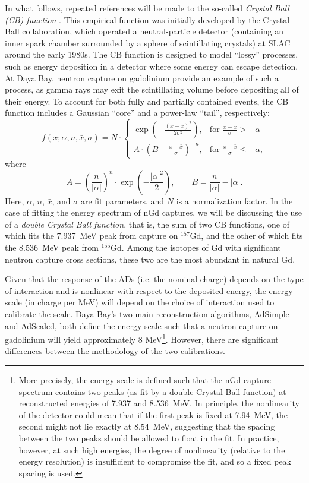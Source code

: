 \documentclass[../thesis.tex]{subfiles}
\begin{document}
In what follows, repeated references will be made to the so-called \emph{Crystal Ball (CB) function} \cite{cbfunction}. This empirical function was initially developed by the Crystal Ball collaboration, which operated a neutral-particle detector (containing an inner spark chamber surrounded by a sphere of scintillating crystals) at SLAC around the early 1980s. The CB function is designed to model ``lossy'' processes, such as energy deposition in a detector where some energy can escape detection. At Daya Bay, neutron capture on gadolinium provide an example of such a process, as gamma rays may exit the scintillating volume before depositing all of their energy. To account for both fully and partially contained events, the CB function includes a Gaussian ``core'' and a power-law ``tail'', respectively:
\begin{equation}
  \label{eq:cbfunction}
  f(x;\alpha,n,\bar x,\sigma) = N \cdot \begin{cases} \exp(- \frac{(x - \bar x)^2}{2 \sigma^2}), & \mbox{for }\frac{x - \bar x}{\sigma} > -\alpha \\
    A \cdot (B - \frac{x - \bar x}{\sigma})^{-n}, & \mbox{for }\frac{x - \bar x}{\sigma} \leqslant -\alpha,\end{cases}
\end{equation}
where
\[
  A = \left(\frac{n}{\left| \alpha \right|}\right)^n \cdot \exp\left(- \frac {\left| \alpha \right|^2}{2}\right),%
  \qquad%
  B = \frac{n}{\left| \alpha \right|}  - \left| \alpha \right|.
\]
Here, $\alpha$, $n$, $\bar x$, and $\sigma$ are fit parameters, and $N$ is a normalization factor. In the case of fitting the energy spectrum of nGd captures, we will be discussing the use of a \emph{double Crystal Ball function}, that is, the sum of two CB functions, one of which fits the 7.937~MeV peak from capture on $^{157}$Gd, and the other of which fits the 8.536~MeV peak from $^{155}$Gd. Among the isotopes of Gd with significant neutron capture cross sections, these two are the most abundant in natural Gd.

Given that the response of the ADs (i.e. the nominal charge) depends on the type of interaction and is nonlinear with respect to the deposited energy, the energy scale (in charge per MeV) will depend on the choice of interaction used to calibrate the scale. Daya Bay's two main reconstruction algorithms, AdSimple and AdScaled, both define the energy scale such that a neutron capture on gadolinium will yield approximately 8 MeV\footnote{More precisely, the energy scale is defined such that the nGd capture spectrum contains two peaks (as fit by a double Crystal Ball function) at reconstructed energies of 7.937 and 8.536~MeV. In principle, the nonlinearity of the detector could mean that if the first peak is fixed at 7.94~MeV, the second might not lie exactly at 8.54~MeV, suggesting that the spacing between the two peaks should be allowed to float in the fit. In practice, however, at such high energies, the degree of nonlinearity (relative to the energy resolution) is insufficient to compromise the fit, and so a fixed peak spacing is used.}. However, there are significant differences between the methodology of the two calibrations.
\end{document}
